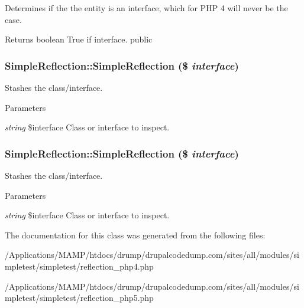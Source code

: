 \label{class_simple_reflection_ae5838a6f80eb13ce9ffc1f935ff0768d}
Determines if the the entity is an interface, which for PHP 4 will never be the case. \begin{DoxyReturn}{Returns}
boolean True if interface.  public 
\end{DoxyReturn}
\hypertarget{class_simple_reflection_ac007edb9004920791d628cad6b234484}{
\subsubsection[{SimpleReflection}]{\setlength{\rightskip}{0pt plus 5cm}SimpleReflection::SimpleReflection (\$ {\em interface})}}
\label{class_simple_reflection_ac007edb9004920791d628cad6b234484}
Stashes the class/interface. 
\begin{DoxyParams}{Parameters}
\item[{\em string}]\$interface Class or interface to inspect. \end{DoxyParams}
\hypertarget{class_simple_reflection_ac007edb9004920791d628cad6b234484}{
\subsubsection[{SimpleReflection}]{\setlength{\rightskip}{0pt plus 5cm}SimpleReflection::SimpleReflection (\$ {\em interface})}}
\label{class_simple_reflection_ac007edb9004920791d628cad6b234484}
Stashes the class/interface. 
\begin{DoxyParams}{Parameters}
\item[{\em string}]\$interface Class or interface to inspect. \end{DoxyParams}


The documentation for this class was generated from the following files:\begin{DoxyCompactItemize}
\item 
/Applications/MAMP/htdocs/drump/drupalcodedump.com/sites/all/modules/simpletest/simpletest/reflection\_\-php4.php\item 
/Applications/MAMP/htdocs/drump/drupalcodedump.com/sites/all/modules/simpletest/simpletest/reflection\_\-php5.php\end{DoxyCompactItemize}
